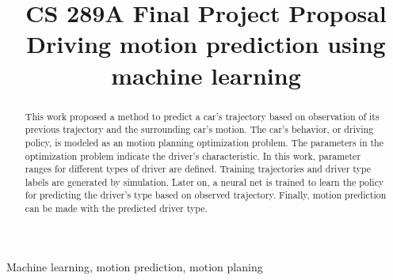 \documentclass[conference]{IEEEtran}
\begin{document}
\title{CS 289A Final Project Proposal\\
Driving motion prediction using machine learning
}

\author{
\and
{}
\and
{}
\and
{}
}

\maketitle

\begin{abstract}
This work proposed a method to predict a car's trajectory based on observation of its previous trajectory and the surrounding car's motion. The car's behavior, or driving policy, is modeled as an motion planning optimization problem. The parameters in the optimization problem indicate the driver's characteristic. In this work, parameter ranges for different types of driver are defined. Training trajectories and driver type labels are generated by simulation. Later on, a neural net is trained to learn the policy for predicting the driver's type based on observed trajectory. Finally, motion prediction can be made with the predicted driver type.
\end{abstract}

\begin{IEEEkeywords}
Machine learning, motion prediction, motion planing
\end{IEEEkeywords}
\end{document}
